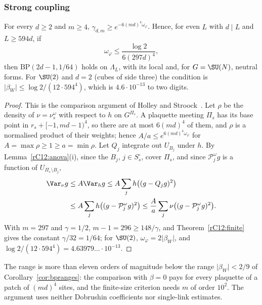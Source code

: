 \subsubsection{Strong coupling}

\begin{corollary}\label{rC12:strong}
For every $d\ge2$ and $m\ge4$, $\gamma_{d,m}\ge e^{-6(md)^4\omega_\varphi}$.
Hence, for even $L$ with $d\mid L$ and $L\ge594d$, if
\[
\omega_\varphi\le\frac{\log2}{6(297d)^4},
\]
then $\mathrm{BP}(2d-1,1/64)$ holds on $\Lambda_L$, with its local and, for
$G=\SU(N)$, neutral forms. For $\SU(2)$ and $d=2$ (cubes of side three) the
condition is $\lvert\beta_W\rvert\le\log2/(12\cdot594^4)$, which is
$4.6\cdot10^{-13}$ to two digits.
\end{corollary}

\begin{proof}
This is the comparison argument of Holley and Stroock~\cite{HS87}. Let
$\rho$ be the density of $\nu=\nu^\omega_s$ with respect to $h$ on
$G^{\Pi_s}$. A plaquette meeting $\Pi_s$ has its base point in $r_s+
[-1,md-1)^4$, so there are at most $6(md)^4$ of them, and $\rho$ is a
normalised product of their weights; hence $A/a\le e^{6(md)^4\omega_\varphi}$
for $A=\max\rho\ge1\ge a=\min\rho$. Let $Q_j$ integrate out $U_{B_j}$ under
$h$. By Lemma~\ref{rC12:anova}(i), since the $B_j$, $j\in S^\circ_s$,
cover $\Pi_s$, and since $\mathcal P^\omega_jg$ is a function of
$U_{\Pi_s\setminus B_j}$,
\[
\begin{split}
\Var_\nu g&\le A\Var_hg\le A\sum_jh\bigl((g-Q_jg)^2\bigr)\\
&\le A\sum_jh\bigl(
(g-\mathcal P^\omega_jg)^2\bigr)\le\frac Aa\sum_j\nu\bigl((g-\mathcal
P^\omega_jg)^2\bigr).
\end{split}
\]
With $m=297$ and $\gamma=1/2$, $m-1=296\ge148/\gamma$, and
Theorem~\ref{rC12:finite} gives the constant $\gamma/32=1/64$; for
$\SU(2)$, $\omega_\varphi=2\lvert\beta_W\rvert$, and $\log2/(12\cdot594^4)=
4.63979\ldots\cdot10^{-13}$.
\end{proof}

The range is more than eleven orders of magnitude below the range
$\lvert\beta_W\rvert<2/9$ of Corollary~\ref{cor:bpranges}: the comparison
with $\beta=0$ pays for every plaquette of a patch of $(md)^4$ sites, and the
finite-size criterion needs $m$ of order $10^2$. The argument uses neither
Dobrushin coefficients nor single-link estimates.


